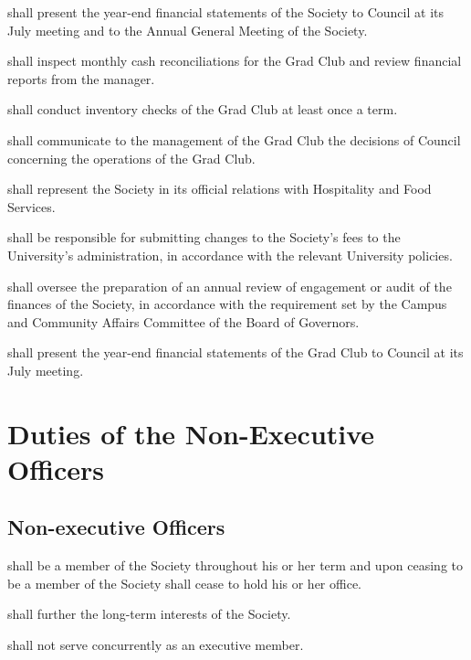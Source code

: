\begin{longenum}[ label*=\thesubsection.\arabic*., align=left]
    \item shall present the year-end financial statements of the Society to Council at its July meeting and to the Annual General Meeting of the Society.
    \item shall inspect monthly cash reconciliations for the Grad Club and review financial reports from the manager.
    \item shall conduct inventory checks of the Grad Club at least once a term.
    \item shall communicate to the management of the Grad Club the decisions of Council concerning the operations of the Grad Club.
    \item shall represent the Society in its official relations with Hospitality and Food Services.
    \item shall be responsible for submitting changes to the Society's fees to the University's administration, in accordance with the relevant University policies.
    \item shall oversee the preparation of an annual review of engagement or audit of the finances of the Society, in accordance with the requirement set by the Campus and Community Affairs Committee of the Board of Governors.
    \item shall present the year-end financial statements of the Grad Club to Council at its July meeting. 
\end{longenum}

\newpage

\section{Duties of the Non-Executive Officers}
\subsection {Non-executive Officers} 
\begin{longenum}[ label*=\thesubsection.\arabic*., align=left]
	\item shall be a member of the Society throughout his or her term and upon ceasing to be a member of the Society shall cease to hold his or her office.
	\item shall further the long-term interests of the Society.
    \item shall not serve concurrently as an executive member.
\end{longenum}
